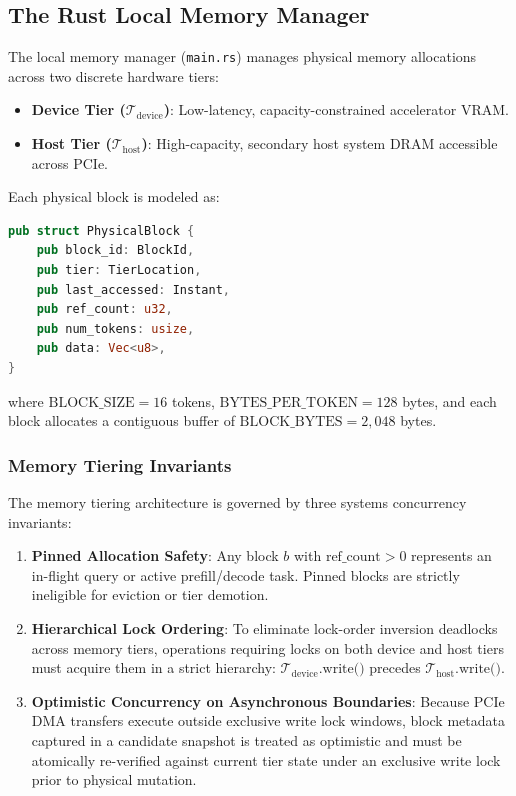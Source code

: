\documentclass[10pt,twocolumn,letterpaper]{article}
\begin{document}
\subsection{The Rust Local Memory Manager}
The local memory manager (\texttt{main.rs}) manages physical memory allocations across two discrete hardware tiers:
\begin{itemize}
    \item \textbf{Device Tier ($\mathcal{T}_{\text{device}}$)}: Low-latency, capacity-constrained accelerator VRAM.
    \item \textbf{Host Tier ($\mathcal{T}_{\text{host}}$)}: High-capacity, secondary host system DRAM accessible across PCIe.
\end{itemize}

Each physical block is modeled as:
\begin{lstlisting}[language=Rust, caption={Physical block structure in Rust memory manager.}]
pub struct PhysicalBlock {
    pub block_id: BlockId,
    pub tier: TierLocation,
    pub last_accessed: Instant,
    pub ref_count: u32,
    pub num_tokens: usize,
    pub data: Vec<u8>,
}
\end{lstlisting}
where $\text{BLOCK\_SIZE} = 16$ tokens, $\text{BYTES\_PER\_TOKEN} = 128$ bytes, and each block allocates a contiguous buffer of $\text{BLOCK\_BYTES} = 2{,}048$ bytes.

\subsubsection{Memory Tiering Invariants}
The memory tiering architecture is governed by three systems concurrency invariants:
\begin{enumerate}
    \item \textbf{Pinned Allocation Safety}: Any block $b$ with $\text{ref\_count} > 0$ represents an in-flight query or active prefill/decode task. Pinned blocks are strictly ineligible for eviction or tier demotion.
    \item \textbf{Hierarchical Lock Ordering}: To eliminate lock-order inversion deadlocks across memory tiers, operations requiring locks on both device and host tiers must acquire them in a strict hierarchy: $\mathcal{T}_{\text{device}}\text{.write()}$ precedes $\mathcal{T}_{\text{host}}\text{.write()}$.
    \item \textbf{Optimistic Concurrency on Asynchronous Boundaries}: Because PCIe DMA transfers execute outside exclusive write lock windows, block metadata captured in a candidate snapshot is treated as optimistic and must be atomically re-verified against current tier state under an exclusive write lock prior to physical mutation.
\end{enumerate}
\end{document}
